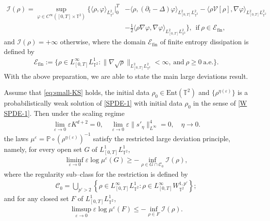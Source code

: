 \begin{align}\label{I0-intro}
 \mathcal{I}(\rho)= \sup_{\varphi\in C^{\infty}([0,T]\times\mathbb{T}^2)}\Big\{\langle \rho,\varphi \rangle_{L^2_{\mathbb{T}^2}}\Big|^T_0 & - \langle \rho,(\partial_t - \Delta)\varphi\rangle_{L_{[0,T]}^2L^2_{\mathbb{T}^2}} - \langle\rho \mathcal{V}[\rho],\nabla\varphi\rangle_{L_{[0,T]}^2L^2_{\mathbb{T}^2}}\nonumber\\
& - \frac{1}{2}\langle \rho\nabla \varphi,\nabla\varphi\rangle_{L_{[0,T]}^2L^2_{\mathbb{T}^2}}\Big\},\ \ \text{if} \ \rho\in \mathcal{E}_{\mathrm{fin}},
\end{align}
and $\mathcal{I}(\rho)=+\infty$ otherwise, where the domain $\mathcal{E}_{\mathrm{fin}}$ of finite entropy dissipation is defined by 
\begin{align}\label{Efin-intro}
\mathcal{E}_{\mathrm{fin}}:=\Big\{\rho\in L_{[0,T]}^{\infty}L^1_{\mathbb{T}^2}:\|\nabla\sqrt{\rho}\|_{L_{[0,T]}^{2}L^2_{\mathbb{T}^2}}<\infty, \ \text{and} \ \rho\geq0\ \text{a.e.}\Big\}.
\end{align}
With the above preparation, we are able to state the main large deviations result. 
\begin{thm}\label{thm:LDP}
Assume that \eqref{eq:small-KS} holds, the initial data $\rho_0 \in \mathrm{Ent}(\mathbb{T}^2)$ and $\{\rho^{\eta(\varepsilon)}\}$ is a probabilistically weak solution of \eqref{SPDE-1} with initial data $\rho_0$ in the sense of \eqref{W SPDE-1}. Then under the scaling regime 
\begin{align}
\lim_{\varepsilon\rightarrow 0}\varepsilon K^{d+2}=0, \quad  \lim_{\varepsilon\rightarrow 0}\varepsilon \|s'_{\eta}\|^4_{L^{\infty}} =0, \quad \eta \to 0.
\end{align}
 the laws $\mu^{\varepsilon}=\mathbb{P}\circ(\rho^{\eta(\varepsilon)})^{-1}$ satisfy the restricted large deviation principle, namely, for every open set $G$ of $L_{[0,T]}^{1}L^1_{\mathbb{T}^2}$,
\begin{align}\label{RS E}
\liminf_{\varepsilon\rightarrow0}\varepsilon  \log \mu^{\varepsilon}(G)\geq-\inf_{\rho\in G\cap\mathcal{C}_0}\mathcal{I}(\rho),
\end{align}
where the regularity sub--class for the restriction is defined by
\begin{align}\label{S-intro}
\mathcal{C}_0 = \bigcup_{p'>2}\left\{\rho\in L_{[0,T]}^{\infty}L^1_{\mathbb{T}^2} : \rho\in L_{[0,T]}^{\infty}W_{\mathbb{T}^2}^{1,p'}\right\};
\end{align}
and for any closed set $F$ of $L_{[0,T]}^{1}L^1_{\mathbb{T}^2}$,
\begin{align}\label{LDP LB}
\limsup_{\varepsilon\rightarrow0}\varepsilon  \log \mu^{\varepsilon}(F)\leq-\inf_{\rho\in F}\mathcal{I}(\rho).
\end{align}
\end{thm}


